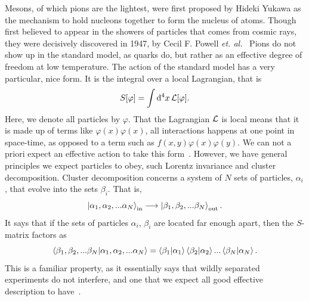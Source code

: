 Mesons, of which pions are the lightest, were first proposed by Hideki Yukawa as the mechanism to hold nucleons together to form the nucleus of atoms.
Though first believed to appear in the showers of particles that comes from cosmic rays, they were decisively discovered in 1947, by Cecil F. Powell \emph{et. al.}~\cite{griffiths:introduction}
Pions do not show up in the standard model, as quarks do, but rather as an effective degree of freedom at low temperature.
The action of the standard model has a very particular, nice form.
It is the integral over a local Lagrangian, that is
\begin{equation}
    S[\varphi] = \int \dd^4 x \, \mathcal{L}[\varphi].
\end{equation}
Here, we denote all particles by $\varphi$.
That the Lagrangian $\mathcal{L}$ is local means that it is made up of terms like $\varphi(x) \varphi(x)$, all interactions happens at one point in space-time, as opposed to a term such as $f(x, y)\varphi(x) \varphi(y)$.
We can not a priori expect an effective action to take this form~\cite{Schwartz:QFT}.
However, we have general principles we expect particles to obey, such Lorentz invariance and cluster decomposition.
Cluster decomposition concerns a system of $N$ sets of particles, $\alpha_i$, that evolve into the sets $\beta_i$.
That is,
\begin{equation}
    \ket{\alpha_1, \alpha_2, ... \alpha_N}_\text{in}
    \longrightarrow
    \ket{\beta_1, \beta_2, ... \beta_N}_\text{out}.
\end{equation}
It says that if the sets of particles $\alpha_i$, $\beta_i$ are located far enough apart, then the $S$-matrix factors as
\begin{equation}
    {\braket{\beta_1, \beta_2, ... \beta_N}{\alpha_1, \alpha_2, ... \alpha_N}}
    =
    \braket{\beta_1}{\alpha_1}\braket{\beta_2}{\alpha_2}... \braket{\beta_N}{\alpha_N}.
\end{equation}
This is a familiar property, as it essentially says that wildly separated experiments do not interfere, and one that we expect all good effective description to have~\cite{weinberg_1995,weinberg_1996_vol2}.

